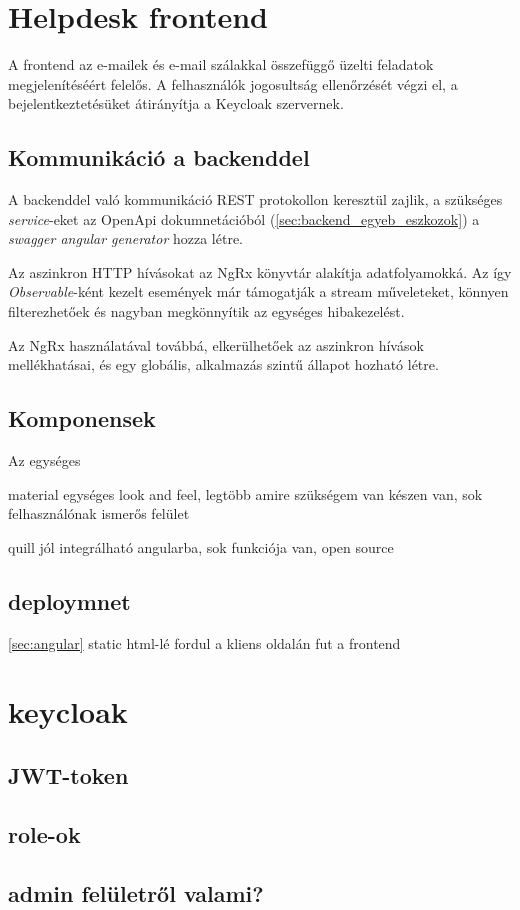 \section{Helpdesk frontend}
A frontend az e-mailek és e-mail szálakkal összefüggő üzelti feladatok megjelenítéséért felelős. A felhasználók jogosultság ellenőrzését végzi el, a bejelentkeztetésüket átirányítja a Keycloak szervernek. 


\subsection{Kommunikáció a backenddel}
A backenddel való kommunikáció REST protokollon keresztül zajlik, a szükséges \textit{service}-eket az OpenApi dokumnetációból (\ref{sec:backend_egyeb_eszkozok}) a \textit{swagger angular generator} hozza létre.

Az aszinkron HTTP hívásokat az NgRx könyvtár alakítja adatfolyamokká. 
Az így \textit{Observable}-ként kezelt események már támogatják a stream műveleteket, könnyen filterezhetőek és nagyban megkönnyítik az egységes hibakezelést. 

Az NgRx használatával továbbá, elkerülhetőek az aszinkron hívások mellékhatásai, és egy globális, alkalmazás szintű állapot hozható létre.

\subsection{Komponensek}
Az egységes 
	

material 
egységes look and feel, legtöbb amire szükségem van készen van,
sok felhasználónak ismerős felület


 quill
jól integrálható angularba, sok funkciója van, open source


\subsection{deploymnet}
\ref{sec:angular}
static html-lé fordul a kliens oldalán fut a frontend






\section{keycloak}	
\subsection{JWT-token}
\subsection{role-ok}
\subsection{admin felületről valami?}